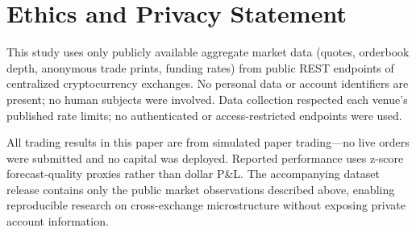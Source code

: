 \section*{Ethics and Privacy Statement}

This study uses only publicly available aggregate market data (quotes, orderbook depth, anonymous trade prints, funding rates) from public REST endpoints of centralized cryptocurrency exchanges. No personal data or account identifiers are present; no human subjects were involved. Data collection respected each venue's published rate limits; no authenticated or access-restricted endpoints were used.

All trading results in this paper are from simulated paper trading---no live orders were submitted and no capital was deployed. Reported performance uses z-score forecast-quality proxies rather than dollar P\&L. The accompanying dataset release contains only the public market observations described above, enabling reproducible research on cross-exchange microstructure without exposing private account information.
